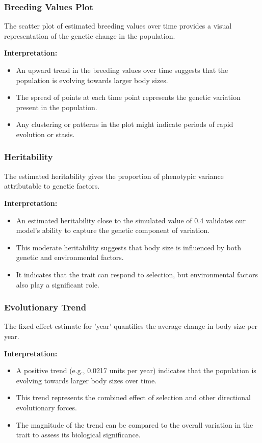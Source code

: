 \documentclass[12pt,a4paper]{article}
\begin{document}
\subsubsection{Breeding Values Plot}

The scatter plot of estimated breeding values over time provides a visual representation of the genetic change in the population.

\textbf{Interpretation:}
\begin{itemize}
    \item An upward trend in the breeding values over time suggests that the population is evolving towards larger body sizes.
    \item The spread of points at each time point represents the genetic variation present in the population.
    \item Any clustering or patterns in the plot might indicate periods of rapid evolution or stasis.
\end{itemize}

\subsubsection{Heritability}

The estimated heritability gives the proportion of phenotypic variance attributable to genetic factors.

\textbf{Interpretation:}
\begin{itemize}
    \item An estimated heritability close to the simulated value of 0.4 validates our model's ability to capture the genetic component of variation.
    \item This moderate heritability suggests that body size is influenced by both genetic and environmental factors.
    \item It indicates that the trait can respond to selection, but environmental factors also play a significant role.
\end{itemize}

\subsubsection{Evolutionary Trend}

The fixed effect estimate for 'year' quantifies the average change in body size per year.

\textbf{Interpretation:}
\begin{itemize}
    \item A positive trend (e.g., 0.0217 units per year) indicates that the population is evolving towards larger body sizes over time.
    \item This trend represents the combined effect of selection and other directional evolutionary forces.
    \item The magnitude of the trend can be compared to the overall variation in the trait to assess its biological significance.
\end{itemize}
\end{document}
